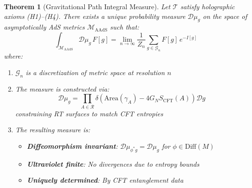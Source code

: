 \documentclass[12pt,a4paper]{article}
\newtheorem{theorem}{Theorem}[section]
\begin{document}
\begin{theorem}[Gravitational Path Integral Measure]\label{thm:grav-measure}
Let $\mathcal{T}$ satisfy holographic axioms (H1)--(H4). There exists a unique probability measure $\mathcal{D}\mu_g$ on the space of asymptotically AdS metrics $\mathcal{M}_{\text{AAdS}}$ such that:
\begin{equation}
\int_{\mathcal{M}_{\text{AAdS}}} \mathcal{D}\mu_g \, F[g] = \lim_{n \to \infty} \frac{1}{Z_n} \sum_{g \in \mathcal{G}_n} F[g] \, e^{-I[g]}
\end{equation}
where:
\begin{enumerate}
    \item $\mathcal{G}_n$ is a discretization of metric space at resolution $n$
    \item The measure is constructed via:
    \begin{equation}
    \mathcal{D}\mu_g = \prod_{A \in \mathcal{R}} \delta\left( \text{Area}(\gamma_A) - 4G_N S_{\text{CFT}}(A) \right) \mathcal{D}g
    \end{equation}
    constraining RT surfaces to match CFT entropies
    \item The resulting measure is:
    \begin{itemize}
        \item \textbf{Diffeomorphism invariant}: $\mathcal{D}\mu_{\phi^*g} = \mathcal{D}\mu_g$ for $\phi \in \text{Diff}(M)$
        \item \textbf{Ultraviolet finite}: No divergences due to entropy bounds
        \item \textbf{Uniquely determined}: By CFT entanglement data
    \end{itemize}
\end{enumerate}
\end{theorem}
\end{document}
